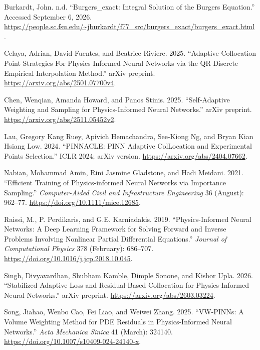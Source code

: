 \documentclass[
  11pt,
]{article}
\newlength{\cslhangindent}
\newlength{\cslentryspacingunit} %
\newenvironment{CSLReferences}[2] %
 {%
  \setlength{\parindent}{0pt}
  \ifodd #1
  \let\oldpar\par
  \def\par{\hangindent=\cslhangindent\oldpar}
  \fi
  \setlength{\parskip}{#2\cslentryspacingunit}
 }%
 {}
\begin{document}
\hypertarget{refs}{}
\begin{CSLReferences}{1}{0}
\leavevmode{}%
Burkardt, John. n.d. {``Burgers\_exact: Integral Solution of the Burgers
Equation.''} Accessed September 6, 2026.
\url{https://people.sc.fsu.edu/~jburkardt/f77_src/burgers_exact/burgers_exact.html}.

\leavevmode{}%
Celaya, Adrian, David Fuentes, and Beatrice Riviere. 2025. {``Adaptive
Collocation Point Strategies For Physics Informed Neural Networks via
the QR Discrete Empirical Interpolation Method.''} arXiv preprint.
\url{https://arxiv.org/abs/2501.07700v4}.

\leavevmode{}%
Chen, Wenqian, Amanda Howard, and Panos Stinis. 2025. {``Self-Adaptive
Weighting and Sampling for Physics-Informed Neural Networks.''} arXiv
preprint. \url{https://arxiv.org/abs/2511.05452v2}.

\leavevmode{}%
Lau, Gregory Kang Ruey, Apivich Hemachandra, See-Kiong Ng, and Bryan
Kian Hsiang Low. 2024. {``PINNACLE: PINN Adaptive ColLocation and
Experimental Points Selection.''} ICLR 2024; arXiv version.
\url{https://arxiv.org/abs/2404.07662}.

\leavevmode{}%
Nabian, Mohammad Amin, Rini Jasmine Gladstone, and Hadi Meidani. 2021.
{``Efficient Training of Physics‐informed Neural Networks via Importance
Sampling.''} \emph{Computer-Aided Civil and Infrastructure Engineering}
36 (August): 962--77. \url{https://doi.org/10.1111/mice.12685}.

\leavevmode{}%
Raissi, M., P. Perdikaris, and G.E. Karniadakis. 2019.
{``Physics-Informed Neural Networks: A Deep Learning Framework for
Solving Forward and Inverse Problems Involving Nonlinear Partial
Differential Equations.''} \emph{Journal of Computational Physics} 378
(February): 686--707. \url{https://doi.org/10.1016/j.jcp.2018.10.045}.

\leavevmode{}%
Singh, Divyavardhan, Shubham Kamble, Dimple Sonone, and Kishor Upla.
2026. {``Stabilized Adaptive Loss and Residual-Based Collocation for
Physics-Informed Neural Networks.''} arXiv preprint.
\url{https://arxiv.org/abs/2603.03224}.

\leavevmode{}%
Song, Jiahao, Wenbo Cao, Fei Liao, and Weiwei Zhang. 2025. {``VW-PINNs:
A Volume Weighting Method for PDE Residuals in Physics-Informed Neural
Networks.''} \emph{Acta Mechanica Sinica} 41 (March): 324140.
\url{https://doi.org/10.1007/s10409-024-24140-x}.


\end{CSLReferences}
\end{document}
